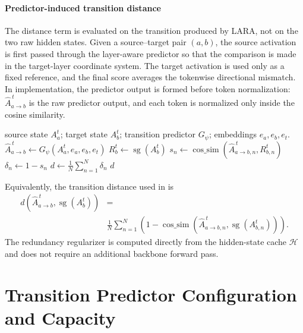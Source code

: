 \paragraph{Predictor-induced transition distance}
The distance term is evaluated on the transition produced by LARA, not on the two raw hidden states. Given a source--target pair $(a,b)$, the source activation is first passed through the layer-aware predictor so that the comparison is made in the target-layer coordinate system. The target activation is used only as a fixed reference, and the final score averages the tokenwise directional mismatch. In implementation, the predictor output is formed before token normalization: $\widehat A_{a\to b}^{\,t}$ is the raw predictor output, and each token is normalized only inside the cosine similarity.

\begin{algorithm}[!htbp]
\caption{\textbf{Predictor-induced transition distance in LARA.}}
\label{alg:lara_transition_distance}
\small
\begin{algorithmic}[1]
\Require source state $A_a^t$; target state $A_b^t$; transition predictor $G_\psi$; embeddings $e_a,e_b,e_t$.
\State $\widehat A_{a\to b}^{\,t}\gets G_\psi(A_a^t,e_a,e_b,e_t)$ 
\State $R_b^t\gets \operatorname{sg}(A_b^t)$
    \State $s_n\gets \operatorname{cos\_sim}(\widehat A_{a\to b,n}^{\,t},R_{b,n}^{t})$ 
    \State $\delta_n\gets 1-s_n$
\EndFor
\State $d\gets \frac{1}{N}\sum_{n=1}^{N}\delta_n$
\State \Return $d$
\end{algorithmic}
\end{algorithm}

Equivalently, the transition distance used in  is
\begin{equation}
\begin{aligned}
d(\widehat A_{a\to b}^{\,t},\operatorname{sg}(A_b^t))
&=\\
&\frac{1}{N}\sum_{n=1}^{N}
\left(
1-
\operatorname{cos\_sim}\left(\widehat A_{a\to b,n}^{\,t},\operatorname{sg}(A_{b,n}^{t})\right)
\right).
\end{aligned}
\label{eq:appendix_token_cosine_distance}
\end{equation}
The redundancy regularizer is computed directly from the hidden-state cache $\mathcal{H}$ and does not require an additional backbone forward pass.

\section{Transition Predictor Configuration and Capacity}
\label{app:predictor_architecture_capacity}

